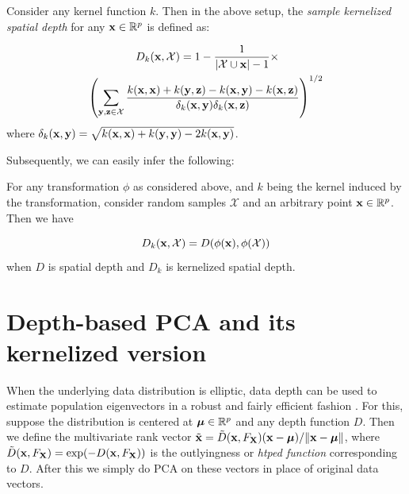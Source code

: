 \documentclass[10pt, conference, compsocconf]{IEEEtran}
\begin{document}
\begin{definition}
Consider any kernel function $k$. Then in the above setup, the \textit{sample kernelized spatial depth} for any ${\bf{x}} \in \mathbb{R}^p$ is defined as:

\begin{equation}
\begin{split}
D_k({\bf{x}}, \mathcal{X}) = 1 - \frac{1}{| \mathcal{X} \cup {\bf{x}} | - 1} \times \qquad\qquad\\
\left( \sum_{{\bf{y}}, {\bf{z}} \in \mathcal{X}} \frac{k({\bf{x}}, {\bf{x}}) + k({\bf{y}}, {\bf{z}}) - k({\bf{x}}, {\bf{y}}) - k({\bf{x}}, {\bf{z}})}{\delta_k({\bf{x}}, {\bf{y}}) \delta_k({\bf{x}}, {\bf{z}})}\right)^{1/2}
\end{split}
\end{equation}
where $\delta_k ({\bf{x}}, {\bf{y}}) = \sqrt{k({\bf{x}}, {\bf{x}}) + k({\bf{y}}, {\bf{y}}) - 2k({\bf{x}}, {\bf{y}})}$.
\end{definition}

Subsequently, we can easily infer the following:

\begin{proposition}\label{prop:prop1}
For any transformation $\phi$ as considered above, and $k$ being the kernel induced by the transformation, consider random samples $\mathcal X$ and an arbitrary point ${\bf{x}} \in \mathbb R^p$. Then we have

\begin{equation}
D_k({\bf{x}}, \mathcal X) = D( \phi({\bf{x}}), \phi(\mathcal X))
\end{equation}
when $D$ is spatial depth and $D_k$ is kernelized spatial depth.
\end{proposition}

\section{Depth-based PCA and its kernelized version}\label{section:sec3}

When the underlying data distribution is elliptic, data depth can be used to estimate population eigenvectors in a robust and fairly efficient fashion \cite{Majumdar15}. For this, suppose the distribution is centered at ${\boldsymbol{\mu}} \in \mathbb R^p$ and any depth function $D$. Then we define the multivariate rank vector $\tilde {{\bf{x}}} = \tilde D({\bf{x}}, F_{\mathbf{X}})({\bf{x}} - {\boldsymbol{\mu}})/\| {\bf{x}} - {\boldsymbol{\mu}} \|$, where $\tilde D({\bf{x}}, F_{\mathbf{X}}) = \exp(-D({\bf{x}}, F_{\mathbf{X}}))$ is the outlyingness or \textit{htped function} corresponding to $D$. After this we simply do PCA on these vectors in place of original data vectors.
\end{document}
